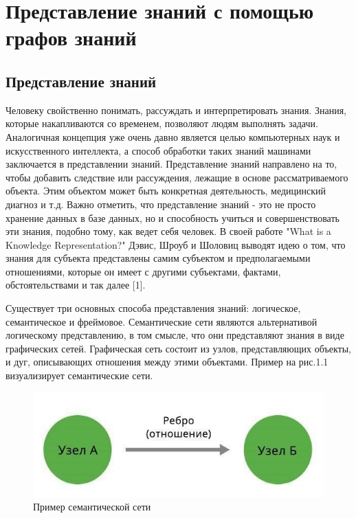 \chapter{Представление знаний с помощью графов знаний} \label{ch1}



\section{Представление знаний}

Человеку свойственно понимать, рассуждать и интерпретировать знания. Знания, которые накапливаются со временем, позволяют людям выполнять
задачи. Аналогичная концепция уже очень давно является целью компьютерных наук и искусственного интеллекта, а способ обработки таких знаний
машинами заключается в представлении знаний. Представление знаний направлено на то, чтобы добавить следствие или рассуждения, лежащие в
основе рассматриваемого объекта. Этим объектом может быть конкретная деятельность, медицинский диагноз и т.д. Важно отметить, что
представление знаний - это не просто хранение данных в базе данных, но и способность учиться и совершенствовать эти знания, подобно тому, как
ведет себя человек. В своей работе "What is a Knowledge Representation?" Дэвис, Шроуб и Шоловиц выводят идею о том, что знания для субъекта
представлены самим субъектом и предполагаемыми отношениями, которые он имеет с другими субъектами, фактами, обстоятельствами и так далее [1].

Существует три основных способа представления знаний: логическое, семантическое и фреймовое. Семантические сети являются альтернативой
логическому представлению, в том смысле, что они представляют знания в виде графических сетей. Графическая сеть состоит из узлов,
представляющих объекты, и дуг, описывающих отношения между этими объектами. Пример на рис.1.1 визуализирует семантические сети.

\begin{figure}[ht!]
    \center
    \includegraphics[scale=0.8]{my_folder/myimg//1}
    \caption{Пример семантической сети}
\end{figure}



